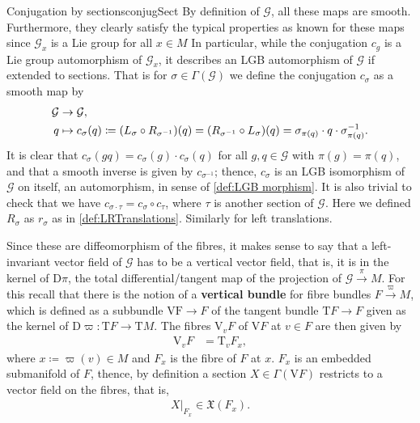 \documentclass[reqno,a4paper,oneside]{amsart}
\theoremstyle{plain}
\theoremstyle{remark}
\theoremstyle{definition}
\begin{document}
\begin{remarks}{Conjugation by sections}{conjugSect}
By definition of $\mathcal{G}$, all these maps are smooth. Furthermore, they clearly satisfy the typical properties as known for these maps since $\mathcal{G}_x$ is a Lie group for all $x \in M$ In particular, while the conjugation $c_g$ is a Lie group automorphism of $\mathcal{G}_x$, it describes an LGB automorphism of $\mathcal{G}$ if extended to sections. That is for $\sigma \in \Gamma(\mathcal{G})$ we define the conjugation $c_\sigma$ as a smooth map by
\begin{align*}
\mathcal{G} &\to \mathcal{G},\\
q &\mapsto c_\sigma(q) \coloneqq \mleft(L_\sigma \circ R_{\sigma^{-1}}\mright)(q) = \mleft( R_{\sigma^{-1}} \circ L_\sigma \mright)(q) = \sigma_{\pi(q)} \cdot q \cdot \sigma_{\pi(q)}^{-1}.
\end{align*}
It is clear that $c_\sigma(gq) = c_\sigma(g) \cdot c_\sigma(q)$ for all $g, q \in \mathcal{G}$ with $\pi(g) = \pi(q)$, and that a smooth inverse is given by $c_{\sigma^{-1}}$; thence, $c_\sigma$ is an LGB isomorphism of $\mathcal{G}$ on itself, an automorphism, in sense of \ref{def:LGB morphism}. It is also trivial to check that we have $c_{\sigma \cdot \tau} = c_\sigma \circ c_\tau$, where $\tau$ is another section of $\mathcal{G}$. Here we defined $R_\sigma$ as $r_\sigma$ as in \ref{def:LRTranslations}. Similarly for left translations.
\end{remarks}

Since these are diffeomorphism of the fibres, it makes sense to say that a left-invariant vector field of $\mathcal{G}$ has to be a vertical vector field, that is, it is in the kernel of $\mathrm{D}\pi$, the total differential/tangent map of the projection of $\mathcal{G} \stackrel{\pi}{\to} M$. For this recall that there is the notion of a \textbf{vertical bundle} for fibre bundles $F \stackrel{\varpi}{\to} M$, which is defined as a subbundle $\mathrm{VF} \to F$ of the tangent bundle $\mathrm{T}F \to F$ given as the kernel of $\mathrm{D}\varpi \colon \mathrm{T}F \to \mathrm{T}M$. The fibres $\mathrm{V}_v F$ of $\mathrm{V}F$ at $v \in F$ are then given by 
\begin{align*}
\mathrm{V}_v F
&=
\mathrm{T}_v F_x,
\end{align*}
where $x \coloneqq \varpi(v) \in M$ and $F_x$ is the fibre of $F$ at $x$. $F_x$ is an embedded submanifold of $F$, thence, by definition a section $X \in \Gamma(\mathrm{V}F)$ restricts to a vector field on the fibres, that is, 
\begin{align*}
X|_{F_x} \in \mathfrak{X}(F_x).
\end{align*}
\end{document}
